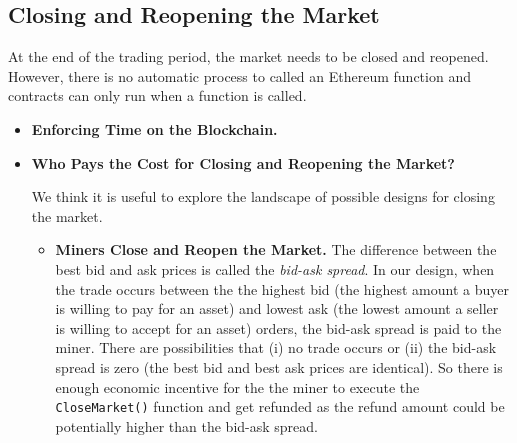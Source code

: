 \subsection{Closing and Reopening the Market}


At the end of the trading period, the market needs to be closed and reopened. However, there is no automatic process to called an Ethereum function and contracts can only run when a function is called. 


\begin{itemize}

\item\textbf{{Enforcing Time on the Blockchain.}}






\item\textbf{{Who Pays the Cost for Closing and Reopening the Market?}}

We think it is useful to explore the landscape of possible designs for closing the market. 

\begin{itemize}

\item \textbf {Miners Close and Reopen the Market.} The difference between the best bid and ask prices is called the \textit{bid-ask spread}. In our design, when the trade occurs between the the highest bid (the highest amount a buyer is willing to pay for an asset) and lowest ask (the lowest amount a seller is willing to accept for an asset) orders, the bid-ask spread is paid to the miner. There are possibilities that (i) no trade occurs or (ii) the bid-ask spread is zero (\ie the best bid and best ask prices are identical). So there is enough economic incentive for the the miner to execute the \texttt{CloseMarket()} function and get refunded as the refund amount could be potentially higher than the bid-ask spread. 


\end{itemize}
\end{itemize}
